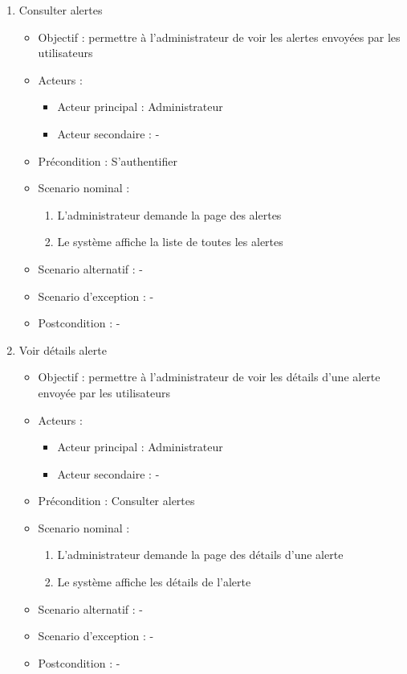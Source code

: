 \begin{enumerate}[label=\alph*.]
	\item Consulter alertes
	\begin{itemize}
		\item Objectif : permettre à l’administrateur de voir les alertes envoyées par les utilisateurs
		\item Acteurs :
		\begin{itemize}
			\item Acteur principal : Administrateur
			\item Acteur secondaire : -
		\end{itemize}
		\item Précondition : S’authentifier
		\item Scenario nominal :
		\begin{enumerate}[label=\arabic*.]
			\item L’administrateur demande la page des alertes
			\item Le système affiche la liste de toutes les alertes
		\end{enumerate}
		\item Scenario alternatif : -
		\item Scenario d’exception : -
		\item Postcondition : -
	\end{itemize}
		
	\item Voir détails alerte
	\begin{itemize}
		\item Objectif : permettre à l’administrateur de voir les détails d’une alerte envoyée par les utilisateurs
		\item Acteurs :
		\begin{itemize}
			\item Acteur principal : Administrateur
			\item Acteur secondaire : -
		\end{itemize}
		\item Précondition : Consulter alertes
		\item Scenario nominal :
		\begin{enumerate}[label=\arabic*.]
			\item L’administrateur demande la page des détails d’une alerte
			\item Le système affiche les détails de l’alerte
		\end{enumerate}
		\item Scenario alternatif : -
		\item Scenario d’exception : -
		\item Postcondition : -
	\end{itemize}
\end{enumerate}

